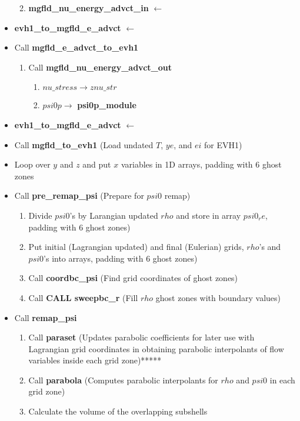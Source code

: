 \documentclass[11pt,doublespace]{article}
\begin{document}
\begin{itemize}
\begin{enumerate}
\begin{enumerate}
\begin{enumerate}
\end{enumerate}
\end{enumerate}
  \item {\bf mgfld\_nu\_energy\_advct\_in} $\leftarrow$
\end{enumerate}
  \item {\bf evh1\_to\_mgfld\_e\_advct}  $\leftarrow$
  \item Call {\bf mgfld\_e\_advct\_to\_evh1}
\begin{enumerate}
  \item Call {\bf mgfld\_nu\_energy\_advct\_out}
\begin{enumerate}
  \item $nu\_stress \rightarrow znu\_str$
  \item $psi0p \rightarrow$ {\bf psi0p\_module}
\end{enumerate}
\end{enumerate}
  \item {\bf evh1\_to\_mgfld\_e\_advct}  $\leftarrow$
  \item Call {\bf mgfld\_to\_evh1} (Load undated $T$, $ye$, and $ei$ for EVH1)
  \item Loop over $y$ and $z$ and put $x$ variables in 1D arrays, padding with 6 ghost zones
  \item Call {\bf pre\_remap\_psi} (Prepare for $psi0$ remap)
 \begin{enumerate}
  \item Divide $psi0$'s by Larangian updated $rho$ and store in array $psi0_re$, padding with 6 ghost zones)
  \item Put initial (Lagrangian updated) and final (Eulerian) grids, $rho$'s and $psi0$'s into arrays, padding with 6 ghost zones)
 \item Call {\bf coordbc\_psi} (Find grid coordinates of ghost zones)
 \item Call {\bf CALL sweepbc\_r} (Fill $rho$ ghost zones with boundary values)
\end{enumerate}
  \item Call {\bf remap\_psi}
\begin{enumerate}
  \item Call {\bf paraset} (Updates parabolic coefficients for later use with Lagrangian grid coordinates   in obtaining parabolic interpolants of flow variables inside each grid zone)*****
  \item Call {\bf parabola} (Computes parabolic interpolants for $rho$ and $psi0$ in each grid zone)
  \item Calculate the volume of the overlapping subshells

\end{enumerate}
\end{itemize}
\end{document}
